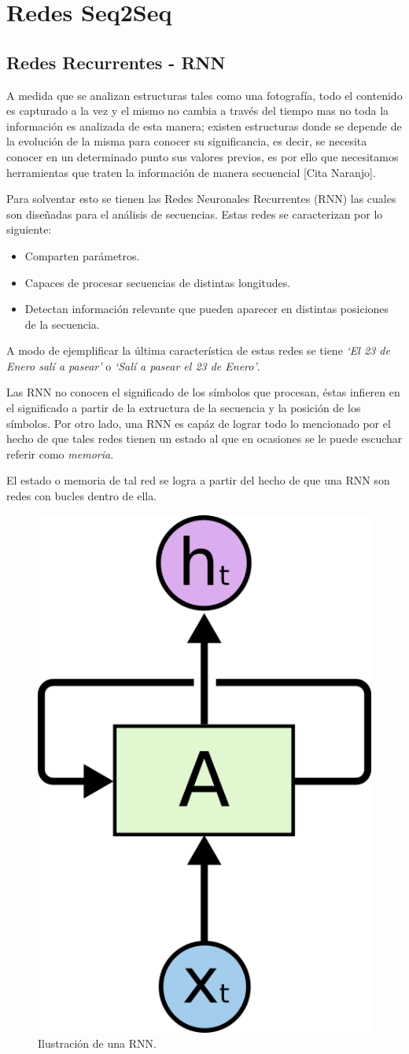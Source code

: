 \documentclass[12pt, letterpaper]{article}
\begin{document}
    \section{Redes Seq2Seq}
    \subsection{Redes Recurrentes - RNN}
    A medida que se analizan estructuras tales como una fotografía, todo el contenido es capturado a la vez y el mismo no cambia a través del tiempo mas no toda la información es analizada de esta manera; existen estructuras donde se depende de la evolución de la misma para conocer su significancia, es decir, se necesita conocer en un determinado punto sus valores previos, es por ello que necesitamos herramientas que traten la información de manera secuencial [Cita Naranjo].

    Para solventar esto se tienen las Redes Neuronales Recurrentes (RNN) las cuales son diseñadas para el análisis de secuencias. Estas redes se caracterizan por lo siguiente:
    
    \begin{itemize}
        \item Comparten parámetros.
        \item Capaces de procesar secuencias de distintas longitudes.
        \item Detectan información relevante que pueden aparecer en distintas posiciones de la secuencia.
    \end{itemize}
    A modo de ejemplificar la última característica de estas redes se tiene \emph{`El 23 de Enero salí a pasear'} o \emph{`Salí a pasear el 23 de Enero'}. 

    Las RNN no conocen el significado de los símbolos que procesan, éstas infieren en el significado a partir de la extructura de la secuencia y la posición de los símbolos. Por otro lado, una RNN es capáz de lograr todo lo mencionado por el hecho de que tales redes tienen un estado al que en ocasiones se le puede escuchar referir como \emph{memoria}.

    El estado o memoria de tal red se logra a partir del hecho de que una RNN son redes con bucles dentro de ella.

    \begin{figure}[H]
        \centering
        \includegraphics[width=0.2\linewidth]{img/RNN-rolled.png}
        \caption{Ilustración de una RNN.}
    \end{figure}
\end{document}
